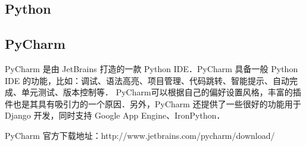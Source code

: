 
\begin{issues}
\issueDraft
\issueTODO
\end{issues}

\subsection{Python}

\subsection{PyCharm}
PyCharm 是由 JetBrains 打造的一款 Python IDE．PyCharm 具备一般 Python IDE 的功能，比如：调试、语法高亮、项目管理、代码跳转、智能提示、自动完成、单元测试、版本控制等． PyCharm可以根据自己的偏好设置风格，丰富的插件也是其具有吸引力的一个原因．另外，PyCharm 还提供了一些很好的功能用于 Django 开发，同时支持 Google App Engine、IronPython．

PyCharm 官方下载地址：http://www.jetbrains.com/pycharm/download/
